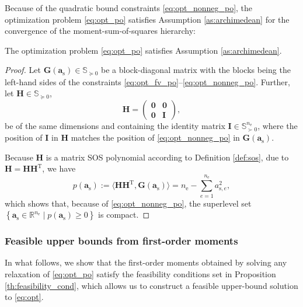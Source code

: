 \documentclass[final,onefignum,onetabnum]{siamart220329}
\newtheorem*{proof}{Proof}%
\begin{document}
Because of the quadratic bound constraints \eqref{eq:opt_nonneg_po}, the optimization problem \eqref{eq:opt_po} satisfies Assumption \ref{as:archimedean} for the convergence of the moment-sum-of-squares hierarchy:

\begin{proposition}
The optimization problem \eqref{eq:opt_po} satisfies Assumption \ref{as:archimedean}.
\end{proposition}
\begin{proof}
	Let $\mathbf{\mathbf{G}}(\mathbf{a_\mathrm{s}}) \in \mathbb{S}_{\succeq 0}$ be a block-diagonal matrix with the blocks being the left-hand sides of the constraints \eqref{eq:opt_fv_po}--\eqref{eq:opt_nonneg_po}. Further, let $\mathbf{H} \in \mathbb{S}_{\succeq 0}$,
	$$\mathbf{H} = \begin{pmatrix}
		\mathbf{0} & \mathbf{0}\\
		\mathbf{0} & \mathbf{I}
	\end{pmatrix},$$
	be of the same dimensions and containing the identity matrix $\mathbf{I} \in \mathbb{S}^{n_\mathrm{e}}_{\succ 0}$, where the position of $\mathbf{I}$ in $\mathbf{H}$ matches the position of \eqref{eq:opt_nonneg_po} in $\mathbf{G}(\mathbf{a}_\mathrm{s})$.
	
	Because $\mathbf{H}$ is a matrix SOS polynomial according to Definition \ref{def:sos}, due to $\mathbf{H} = \mathbf{H}\mathbf{H}^\mathrm{T}$, we have
	\begin{equation}
		p(\mathbf{a}_\mathrm{s}) := \langle \mathbf{H}\mathbf{H}^\mathrm{T}, \mathbf{G}(\mathbf{a}_\mathrm{s}) \rangle = n_\mathrm{e} - \sum_{e=1}^{n_\mathrm{e}} a^2_{\mathrm{s},e},
	\end{equation}
	which shows that{, because of \eqref{eq:opt_nonneg_po},} the superlevel set $\left\{ \mathbf{a}_\mathrm{s}\in \mathbb{R}^{n_\mathrm{e}} \; \lvert \; p(\mathbf{a}_\mathrm{s}) \ge 0 \right\}$ is compact.
\end{proof}

\subsubsection{Feasible upper bounds from first-order moments}
In what follows, we show that the first-order moments obtained by solving any relaxation of \eqref{eq:opt_po} satisfy the {feasibility conditions} set in Proposition \ref{th:feasibility_cond}, which allows us to construct a feasible upper-bound solution to \eqref{eq:opt}.
\end{document}
